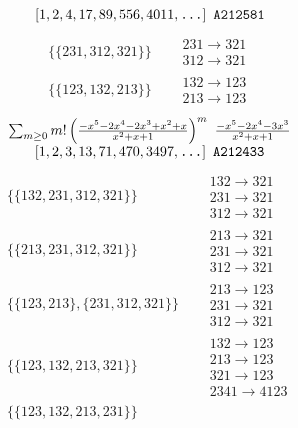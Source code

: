 \begin{tiny}
$$\begin{matrix}
\left[1, 2, 4, 17, 89, 556, 4011, \text{\texttt{...}}\right]
\ 
\texttt{A212581}
\end{matrix}
$$
\vspace{-1em}
\begin{align}
\{\{231, 312, 321\}\}
\quad
&
\begin{matrix}
231 \to 321\\312 \to 321
\end{matrix}
\\
\{\{123, 132, 213\}\}
\quad
&
\begin{matrix}
132 \to 123\\213 \to 123
\end{matrix}
\end{align}
$$
\begin{matrix}
\sum_{m \geq 0} m! \left(
\frac{-x^{5} - 2 x^{4} - 2 x^{3} + x^{2} + x}{x^{2} + x + 1}
\right)^m
\ 
\frac{-x^{5} - 2 x^{4} - 3 x^{3}}{x^{2} + x + 1}
\\
\left[1, 2, 3, 13, 71, 470, 3497, \text{\texttt{...}}\right]
\ 
\texttt{A212433}
\end{matrix}
$$
\vspace{-1em}
\begin{align}
\{\{132, 231, 312, 321\}\}
\quad
&
\begin{matrix}
132 \to 321\\231 \to 321\\312 \to 321
\end{matrix}
\\
\{\{213, 231, 312, 321\}\}
\quad
&
\begin{matrix}
213 \to 321\\231 \to 321\\312 \to 321
\end{matrix}
\\
\{\{123, 213\}, \{231, 312, 321\}\}
\quad
&
\begin{matrix}
213 \to 123\\231 \to 321\\312 \to 321
\end{matrix}
\\
\{\{123, 132, 213, 321\}\}
\quad
&
\begin{matrix}
132 \to 123\\213 \to 123\\321 \to 123\\2341 \to 4123
\end{matrix}
\\
\{\{123, 132, 213, 231\}\}
\quad
&
\begin{matrix}

\end{matrix}
\end{align}
\end{tiny}
